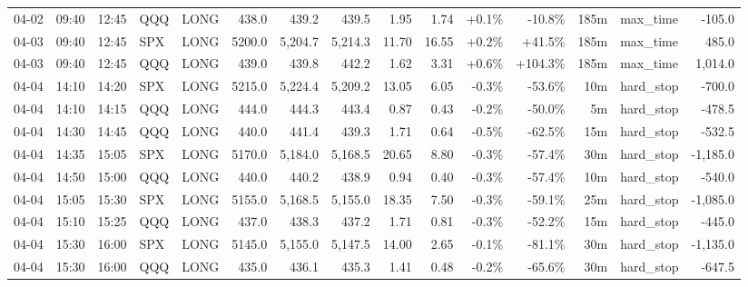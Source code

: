 \documentclass[11pt,a4paper,twoside]{article}
\begin{document}
\begin{landscape}
\begin{center}
\begin{longtable}{>{\color{txtmain}}l l l l l r r r r r r r r >{\color{txtmain}}l r}
04-02 & 09:40 & 12:45 & QQQ & LONG & 438.0 & 439.2 & 439.5 & 1.95 & 1.74 & \textcolor{wingreen}{+0.1\%} & \textcolor{lossred}{-10.8\%} & 185m & max\_time & \textcolor{lossred}{-105.0} \\
04-03 & 09:40 & 12:45 & SPX & LONG & 5200.0 & 5,204.7 & 5,214.3 & 11.70 & 16.55 & \textcolor{wingreen}{+0.2\%} & \textcolor{wingreen}{+41.5\%} & 185m & max\_time & \textcolor{wingreen}{485.0} \\
04-03 & 09:40 & 12:45 & QQQ & LONG & 439.0 & 439.8 & 442.2 & 1.62 & 3.31 & \textcolor{wingreen}{+0.6\%} & \textcolor{wingreen}{+104.3\%} & 185m & max\_time & \textcolor{wingreen}{1,014.0} \\
04-04 & 14:10 & 14:20 & SPX & LONG & 5215.0 & 5,224.4 & 5,209.2 & 13.05 & 6.05 & \textcolor{lossred}{-0.3\%} & \textcolor{lossred}{-53.6\%} & 10m & hard\_stop & \textcolor{lossred}{-700.0} \\
04-04 & 14:10 & 14:15 & QQQ & LONG & 444.0 & 444.3 & 443.4 & 0.87 & 0.43 & \textcolor{lossred}{-0.2\%} & \textcolor{lossred}{-50.0\%} & 5m & hard\_stop & \textcolor{lossred}{-478.5} \\
04-04 & 14:30 & 14:45 & QQQ & LONG & 440.0 & 441.4 & 439.3 & 1.71 & 0.64 & \textcolor{lossred}{-0.5\%} & \textcolor{lossred}{-62.5\%} & 15m & hard\_stop & \textcolor{lossred}{-532.5} \\
04-04 & 14:35 & 15:05 & SPX & LONG & 5170.0 & 5,184.0 & 5,168.5 & 20.65 & 8.80 & \textcolor{lossred}{-0.3\%} & \textcolor{lossred}{-57.4\%} & 30m & hard\_stop & \textcolor{lossred}{-1,185.0} \\
04-04 & 14:50 & 15:00 & QQQ & LONG & 440.0 & 440.2 & 438.9 & 0.94 & 0.40 & \textcolor{lossred}{-0.3\%} & \textcolor{lossred}{-57.4\%} & 10m & hard\_stop & \textcolor{lossred}{-540.0} \\
04-04 & 15:05 & 15:30 & SPX & LONG & 5155.0 & 5,168.5 & 5,155.0 & 18.35 & 7.50 & \textcolor{lossred}{-0.3\%} & \textcolor{lossred}{-59.1\%} & 25m & hard\_stop & \textcolor{lossred}{-1,085.0} \\
04-04 & 15:10 & 15:25 & QQQ & LONG & 437.0 & 438.3 & 437.2 & 1.71 & 0.81 & \textcolor{lossred}{-0.3\%} & \textcolor{lossred}{-52.2\%} & 15m & hard\_stop & \textcolor{lossred}{-445.0} \\
04-04 & 15:30 & 16:00 & SPX & LONG & 5145.0 & 5,155.0 & 5,147.5 & 14.00 & 2.65 & \textcolor{lossred}{-0.1\%} & \textcolor{lossred}{-81.1\%} & 30m & hard\_stop & \textcolor{lossred}{-1,135.0} \\
04-04 & 15:30 & 16:00 & QQQ & LONG & 435.0 & 436.1 & 435.3 & 1.41 & 0.48 & \textcolor{lossred}{-0.2\%} & \textcolor{lossred}{-65.6\%} & 30m & hard\_stop & \textcolor{lossred}{-647.5} \\

\end{longtable}
\end{center}
\end{landscape}
\end{document}
